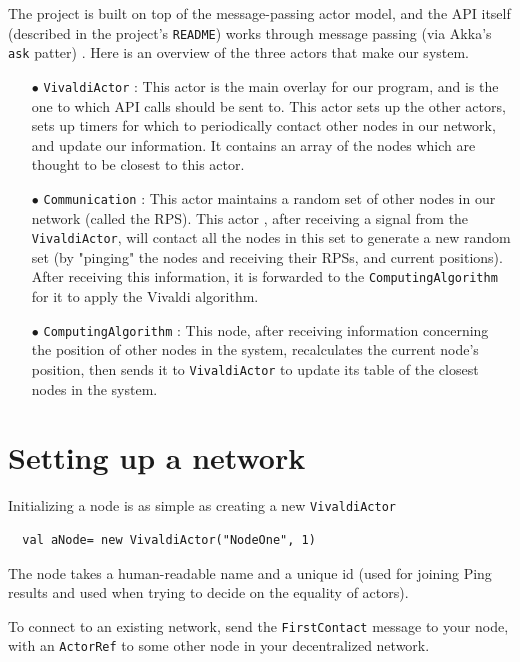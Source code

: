 \documentclass[11pt,a4paper]{article}
\begin{document}
The project is built on top of the message-passing actor model, and the API itself (described in the project's \verb|README|) works through message passing (via Akka's \verb|ask| patter) . Here is an overview of the three actors that make our system. 
\begin{itemize}
	\item[$\bullet$] \verb|VivaldiActor| : This actor is the main overlay for our program, and is the one to which API calls should be sent to. This actor sets up the other actors, sets up timers for which to periodically contact other nodes in our network, and update our information. It contains an array of the nodes which are thought to be closest to this actor.
	
	\item[$\bullet$] \verb|Communication| : 
	   This actor maintains a random set of other nodes in our network (called the RPS). This actor , after receiving a signal from the \verb|VivaldiActor|, will contact all the nodes in this set to generate a new random set (by "pinging" the nodes and receiving their RPSs, and current positions). After receiving this information, it is forwarded to the \verb|ComputingAlgorithm| for it to apply the Vivaldi algorithm.
		
	\item[$\bullet$] \verb|ComputingAlgorithm| : This node, after receiving information concerning the position of other nodes in the system, recalculates the current node's position, then sends it to \verb|VivaldiActor| to update its table of the closest nodes in the system.
\end{itemize}


\section{Setting up a network}

 Initializing a node is as simple as creating a new \verb|VivaldiActor|
 \begin{lstlisting}
  val aNode= new VivaldiActor("NodeOne", 1)
 \end{lstlisting}
 
 The node takes a human-readable name and a unique id (used for joining Ping results and used when trying to decide on the equality of actors). 
 
 To connect to an existing network, send the \verb|FirstContact| message to your node, with an \verb|ActorRef| to some other node in your decentralized network.
 
\end{document}

